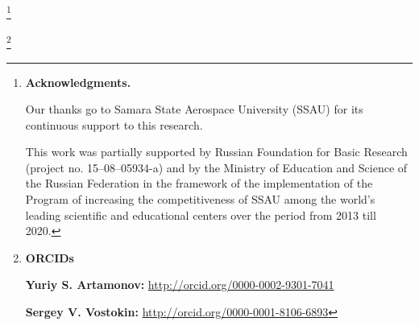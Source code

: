\RuDate





\newpage



\makeentitle









\thanks{\textbf{Acknowledgments.} 

Our thanks go to Samara State Aerospace University (SSAU) for its continuous support to this research. 

This work was partially supported by Russian Foundation for Basic Research (project no. 15--08--05934-a) and by the Ministry of Education and Science of the Russian Federation in  the  framework  of  the  implementation  of  the  Program  of  increasing  the  competitiveness  of SSAU among the world's leading scientific and educational centers over the period from 2013 till 2020.

}



\thanks{{\bf ORCIDs}



{\bf Yuriy S. Artamonov:} \url{http://orcid.org/0000-0002-9301-7041}



{\bf Sergey V. Vostokin:} \url{http://orcid.org/0000-0001-8106-6893}



}







\EngRef







